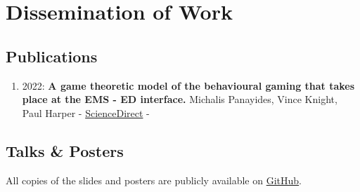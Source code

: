 \chapter*{Dissemination of Work}

\section*{Publications}
\begin{enumerate}
\def\labelenumi{\arabic{enumi}.}
\item
2022: \textbf{A game theoretic model of the behavioural gaming that takes place
at the EMS - ED interface.} Michalis Panayides, Vince Knight, Paul Harper -
\href{https://www.sciencedirect.com/science/article/pii/S0377221722005549?via%3Dihub}{ScienceDirect} -
\end{enumerate}

\section*{Talks \& Posters}

All copies of the slides and posters are publicly available on
\href{https://github.com/MichalisPanayides/Talks}{GitHub}.


